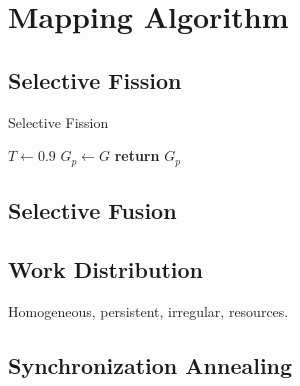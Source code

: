 \section{Mapping Algorithm}

\subsection{Selective Fission}
\begin{algorithm}
\caption{Selective Fission}\label{alg:select_fis}
\begin{algorithmic}
\State $T \gets 0.9$
\Repeat
\State $G_p \gets G$
\State \textbf{return} $G_p$
\EndProcedure
\end{algorithmic}
\end{algorithm}


\subsection{Selective Fusion}

\subsection{Work Distribution}
Homogeneous, persistent, irregular, resources.

\subsection{Synchronization Annealing}